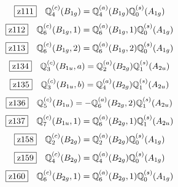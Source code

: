 \documentclass[fleqn,10pt,landscape]{jsarticle}
\begin{document}
\begin{dmath*}
\hspace*{3mm}\fbox{z111}\quad \mathbb{Q}_{4}^{(c)}(B_{1g})=\mathbb{Q}_{4}^{(a)}(B_{1g}) \mathbb{Q}_{0}^{(s)}(A_{1g})
\end{dmath*}
\begin{dmath*}
\hspace*{3mm}\fbox{z112}\quad \mathbb{Q}_{6}^{(c)}(B_{1g},1)=\mathbb{Q}_{6}^{(a)}(B_{1g},1) \mathbb{Q}_{0}^{(s)}(A_{1g})
\end{dmath*}
\begin{dmath*}
\hspace*{3mm}\fbox{z113}\quad \mathbb{Q}_{6}^{(c)}(B_{1g},2)=\mathbb{Q}_{6}^{(a)}(B_{1g},2) \mathbb{Q}_{0}^{(s)}(A_{1g})
\end{dmath*}
\begin{dmath*}
\hspace*{3mm}\fbox{z134}\quad \mathbb{Q}_{3}^{(c)}(B_{1u},a)=\mathbb{Q}_{2}^{(a)}(B_{2g}) \mathbb{Q}_{1}^{(s)}(A_{2u})
\end{dmath*}
\begin{dmath*}
\hspace*{3mm}\fbox{z135}\quad \mathbb{Q}_{3}^{(c)}(B_{1u},b)=\mathbb{Q}_{4}^{(a)}(B_{2g}) \mathbb{Q}_{1}^{(s)}(A_{2u})
\end{dmath*}
\begin{dmath*}
\hspace*{3mm}\fbox{z136}\quad \mathbb{Q}_{5}^{(c)}(B_{1u})=- \mathbb{Q}_{6}^{(a)}(B_{2g},2) \mathbb{Q}_{1}^{(s)}(A_{2u})
\end{dmath*}
\begin{dmath*}
\hspace*{3mm}\fbox{z137}\quad \mathbb{Q}_{7}^{(c)}(B_{1u},1)=\mathbb{Q}_{6}^{(a)}(B_{2g},1) \mathbb{Q}_{1}^{(s)}(A_{2u})
\end{dmath*}
\begin{dmath*}
\hspace*{3mm}\fbox{z158}\quad \mathbb{Q}_{2}^{(c)}(B_{2g})=\mathbb{Q}_{2}^{(a)}(B_{2g}) \mathbb{Q}_{0}^{(s)}(A_{1g})
\end{dmath*}
\begin{dmath*}
\hspace*{3mm}\fbox{z159}\quad \mathbb{Q}_{4}^{(c)}(B_{2g})=\mathbb{Q}_{4}^{(a)}(B_{2g}) \mathbb{Q}_{0}^{(s)}(A_{1g})
\end{dmath*}
\begin{dmath*}
\hspace*{3mm}\fbox{z160}\quad \mathbb{Q}_{6}^{(c)}(B_{2g},1)=\mathbb{Q}_{6}^{(a)}(B_{2g},1) \mathbb{Q}_{0}^{(s)}(A_{1g})
\end{dmath*}
\end{document}
